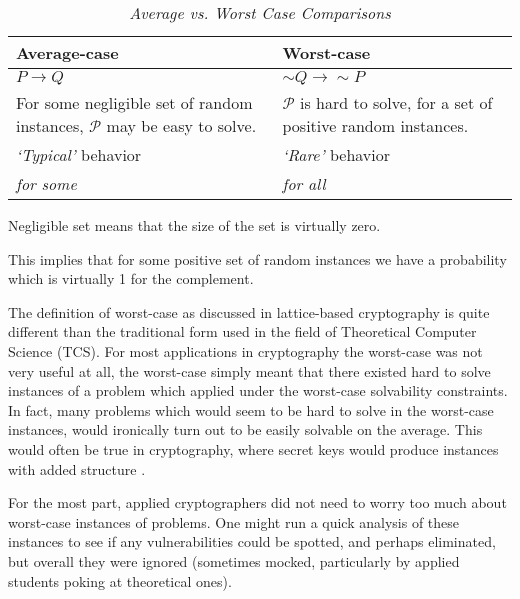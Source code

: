 \begin{table}
\begin{center}
\begin{tabularx}{300pt}{|X|X|} \hline
    \textbf{Average-case} & \textbf{Worst-case} \\ \hline
    $P \rightarrow Q$ & $\sim Q \rightarrow \sim P$ \\ \hline
    For some negligible set of random instances, $\mathcal{P}$ may be easy to solve. & $\mathcal{P}$ is hard to solve, for a set of positive random instances. \\ \hline
    \emph{`Typical'} behavior & \emph{`Rare'} behavior \\ \hline
    \emph{for some} & \emph{for all} \\ \hline
\end{tabularx}
\caption{\textit{\small{Average vs. Worst Case Comparisons}}}
\label{tb: classvquantaavgworsecon}
\end{center}
\end{table}    
    

\begin{summ}
    Negligible set means that the size of the set is virtually zero. 
    
    This implies that for some positive set of random instances we have a probability which is virtually 1 for the complement.
\end{summ}



The definition of worst-case as discussed in lattice-based cryptography is quite different than the traditional form used in the field of Theoretical Computer Science (TCS). For most applications in cryptography the worst-case was not very useful at all, the worst-case simply meant that there existed hard to solve instances of a problem which applied under the worst-case solvability constraints. In fact, many problems which would seem to be hard to solve in the worst-case instances, would ironically turn out to be easily solvable on the average. This would often be true in cryptography, where secret keys would produce instances with added structure \cite{Pei2015}.  


For the most part, applied cryptographers did not need to worry too much about worst-case instances of problems. One might run a quick analysis of these instances to see if any vulnerabilities could be spotted, and perhaps eliminated, but overall they were ignored (sometimes mocked, particularly by applied students poking at theoretical ones). 













    